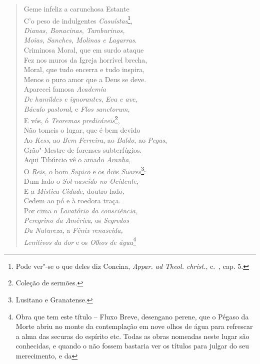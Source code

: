 \begin{verse}
Geme infeliz a carunchosa Estante\\
C'o peso de indulgentes \textit{Casuístas}\footnote{ Pode ver"-se o
que deles diz Concina, \textit{Appar. ad Theol. christ.}, c.~, cap. 5.},\\		\index{\Casui}
\textit{Dianas, Bonacinas, Tamburinos,}\\
\textit{Moias, Sanches, Molinas e Lagarras}.\\ %
Criminosa Moral, que em surdo ataque\\
Fez nos muros da Igreja horrível brecha,\\
Moral, que tudo encerra e tudo inspira,\\
Menos o puro amor que a Deus se deve.\\
Aparecei famosa \textit{Academia}\\
\textit{De humildes e ignorantes}, \textit{Eva e ave},\\
\textit{Báculo pastoral}, e \textit{Flos sanctorum},\\
E vós, ó \textit{Teoremas predicáveis}\footnote{ Coleção de sermões.},\\
Não tomeis o lugar, que é bem devido\\
Ao \textit{Kess}, ao \textit{Bem Ferreira}, ao \textit{Baldo}, ao \textit{Pegas},\\
Grão"-Mestre de forenses subterfúgios.\\ %
Aqui Tibúrcio vê o amado \textit{Aranha},\\
O \textit{Reis}, o bom \textit{Supico} e os dois
\textit{Suares}\footnote{ Lusitano e Granatense.}:\\ %
Dum lado o \textit{Sol nascido no Ocidente},\\
E a \textit{Mística Cidade}, doutro lado,\\
Cedem ao pó e à roedora traça.\\
Por cima o \textit{Lavatório da consciência},\\
\textit{Peregrino da América}, os \textit{Segredos}\\
\textit{Da Natureza}, a \textit{Fênix renascida,}\\
\textit{Lenitivos da dor} e os \textit{Olhos de água}\footnote{ Obra
que tem este título -- Fluxo Breve, desengano perene, que o Pégaso da Morte
abriu no monte da contemplação em nove olhos de água para refrescar a alma das
securas do espírito etc. Todas as obras nomeadas neste lugar são conhecidas, e
quando o não fossem bastaria ver os títulos para julgar do seu merecimento, e da
}
\end{verse}
